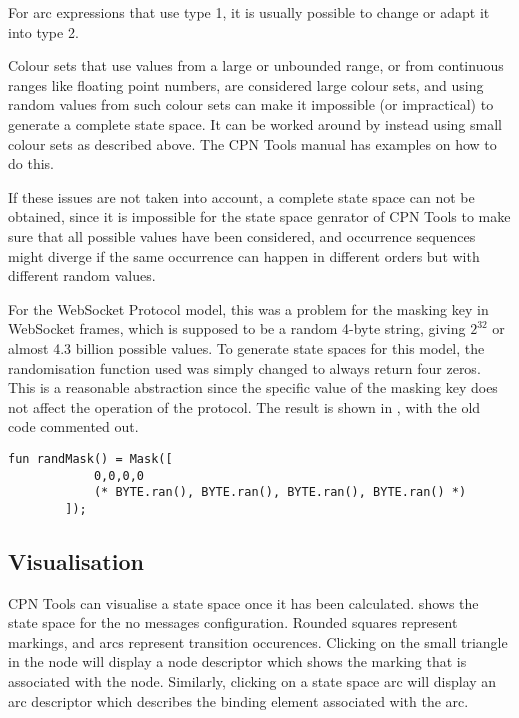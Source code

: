 		For arc expressions that use type 1, it is usually possible to change or
		adapt it into type 2.
		
		Colour sets that use values from a large or unbounded range, or from continuous
		ranges like floating point numbers, are considered large colour sets, and using
		random values from such colour sets can make it impossible (or impractical)
		to generate a complete state space. It can be worked around by
		instead using small colour sets as described above. The CPN Tools manual has
		examples on how to do this.
		
		If these issues are not taken into account, a complete state space can not be
		obtained, since it is impossible for the state space genrator of CPN Tools to
		make sure that all possible values have been considered, and occurrence
		sequences might diverge if the same occurrence can happen in different orders but with different
		random values.
		
		For the WebSocket Protocol model, this was a problem for the masking
		key in WebSocket frames, which is supposed to be a random 4-byte string,
		giving $2^{32}$ or almost 4.3 billion possible values.
		To generate state spaces for this model, the randomisation function used was
		simply changed to always return four zeros. This is a reasonable abstraction
		since the specific value of the masking key does not affect the operation of
		the protocol. The result is shown in , with the old
		code commented out.
		
		\begin{lstlisting}[label=lst:fixed_masking_key,gobble=2,caption=Fixed masking
		key] 
		fun	randMask() = Mask([ 
			0,0,0,0
			(* BYTE.ran(), BYTE.ran(), BYTE.ran(), BYTE.ran() *)
		]);
		\end{lstlisting}
	
	\subsection{Visualisation}
	 CPN Tools can visualise a
	state space once it has been calculated.
	 shows the state space for the no messages
	configuration. Rounded squares represent markings, and arcs represent
	transition occurences. Clicking on the small triangle in the node will display
	a node descriptor which shows the marking that is associated with the node.
	Similarly, clicking on a state space arc will display an arc descriptor which
	describes the binding element associated with the arc. 

